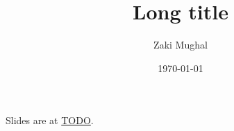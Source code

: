 \documentclass[%
        hyperref={%
                pdfauthor={Zakariyya Mughal},%
                pdfpagemode={None},pdfpagelayout={SinglePage}}%
        xcolor={x11names},%
]{beamer}
\title[Short title]{Long title}
\author{Zaki Mughal}
\institute{Computational Biomedicine Lab\\University of Houston}
\date{\today}
\begin{document}
\frame{\titlepage}
\begin{frame}
	Slides are at \url{TODO}.
\end{frame}




\end{document}
